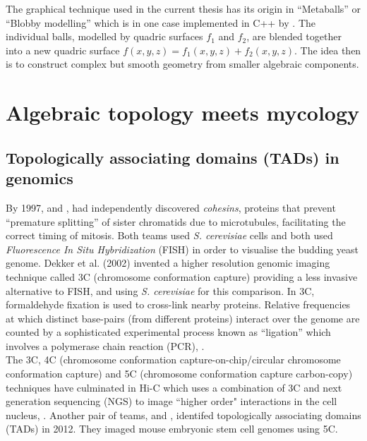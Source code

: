 The graphical technique used in the current thesis has its origin in ``Metaballs'' or 
``Blobby modelling'' which is in one case
implemented in C++ by \cite{kommareddy20143d}. The individual balls, 
modelled by quadric surfaces $f_1$ and $f_2$, are blended together 
into a new quadric surface $f(x,y,z) = f_1(x,y,z) + f_2(x,y,z)$. The idea then 
is to construct complex but smooth geometry from smaller algebraic components.
\\

\section{Algebraic topology meets mycology}

\subsection{Topologically associating domains (TADs) in genomics}

By 1997, \cite{guacci1997direct} and \cite{michaelis1997cohesins},
had independently discovered \textit{cohesins}, proteins that 
prevent ``premature splitting'' of sister chromatids due 
to microtubules, facilitating the correct timing of mitosis. 
Both teams used \textit{S. cerevisiae} cells and both
used \textit{Fluorescence In Situ Hybridization} (FISH) in order to visualise 
the budding yeast genome. Dekker et al. (2002) invented a higher 
resolution genomic imaging technique called 3C (chromosome conformation capture)
\cite{dekker2002capturing} providing a less invasive alternative 
to FISH, and using \textit{S. cerevisiae} for this comparison.
In 3C, formaldehyde fixation is used to cross-link nearby proteins.
Relative frequencies at which distinct base-pairs (from different proteins)
interact over the genome are counted by a sophisticated experimental
process known as ``ligation'' which involves a polymerase chain reaction (PCR),
\cite{dekker2002capturing}.
\\

The 3C, 4C (chromosome conformation capture-on-chip/circular chromosome conformation capture) and 5C 
(chromosome conformation capture carbon-copy) techniques have culminated in Hi-C which 
uses a combination of 3C and next generation sequencing (NGS) to image ``higher order" interactions 
in the cell nucleus, \cite{nora2012spatial}. Another pair of teams, \cite{nora2012spatial} and 
\cite{dixon2012topological}, identifed topologically associating domains (TADs) in 2012. 
They imaged mouse embryonic stem cell genomes using 5C.
\\

